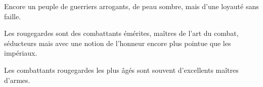  Encore un peuple de guerriers arrogants, de peau sombre, mais d'une loyauté sans faille.
  
  Les rougegardes sont des combattants émérites, maîtres de l'art du combat, séducteurs mais avec une notion de l'honneur encore plus pointue que les impériaux.
  
  Les combattants rougegardes les plus âgés sont souvent d'excellents maîtres d'armes.

